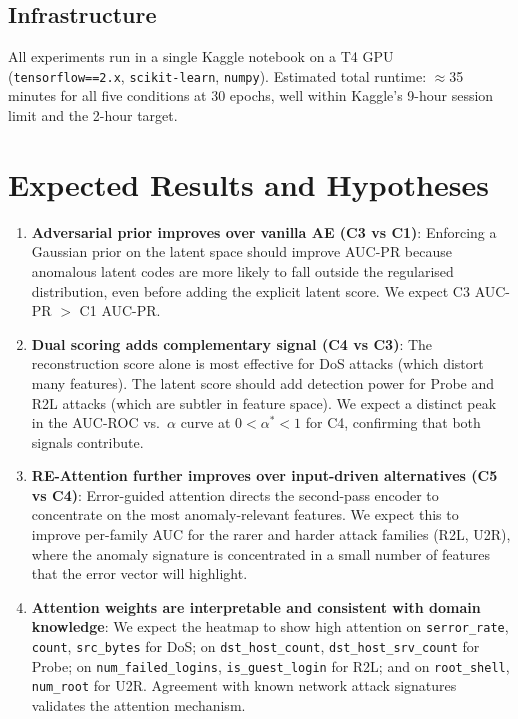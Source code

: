 \documentclass[12pt,a4paper]{article}
\begin{document}
\subsection{Infrastructure}

All experiments run in a single Kaggle notebook on a T4 GPU
(\texttt{tensorflow==2.x}, \texttt{scikit-learn}, \texttt{numpy}).
Estimated total runtime: $\approx$35 minutes for all five conditions at 30 epochs,
well within Kaggle's 9-hour session limit and the 2-hour target.

\section{Expected Results and Hypotheses}

\begin{enumerate}[leftmargin=2em, label=\textbf{H\arabic*.}]

    \item \textbf{Adversarial prior improves over vanilla AE (C3 vs C1)}:
          Enforcing a Gaussian prior on the latent space should improve AUC-PR
          because anomalous latent codes are more likely to fall outside the
          regularised distribution, even before adding the explicit latent score.
          We expect C3 AUC-PR $>$ C1 AUC-PR.

    \item \textbf{Dual scoring adds complementary signal (C4 vs C3)}:
          The reconstruction score alone is most effective for DoS attacks
          (which distort many features). The latent score should add detection
          power for Probe and R2L attacks (which are subtler in feature space).
          We expect a distinct peak in the AUC-ROC vs.\ $\alpha$ curve at
          $0 < \alpha^* < 1$ for C4, confirming that both signals contribute.

    \item \textbf{RE-Attention further improves over input-driven alternatives (C5 vs C4)}:
          Error-guided attention directs the second-pass encoder to concentrate
          on the most anomaly-relevant features. We expect this to improve
          per-family AUC for the rarer and harder attack families (R2L, U2R),
          where the anomaly signature is concentrated in a small number of
          features that the error vector will highlight.

    \item \textbf{Attention weights are interpretable and consistent with domain
          knowledge}: We expect the heatmap to show high attention on
          \texttt{serror\_rate}, \texttt{count}, \texttt{src\_bytes} for DoS;
          on \texttt{dst\_host\_count}, \texttt{dst\_host\_srv\_count} for Probe;
          on \texttt{num\_failed\_logins}, \texttt{is\_guest\_login} for R2L;
          and on \texttt{root\_shell}, \texttt{num\_root} for U2R. Agreement
          with known network attack signatures validates the attention mechanism.

\end{enumerate}
\end{document}
